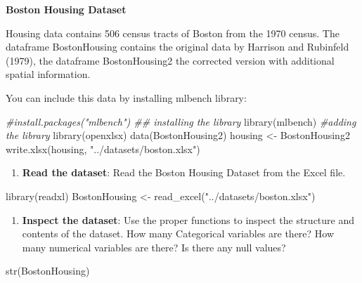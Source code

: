 \documentclass[
]{book}
\newenvironment{Shaded}{\begin{snugshade}}{\end{snugshade}}
\newcommand{\CommentTok}[1]{\textcolor[rgb]{0.56,0.35,0.01}{\textit{#1}}}
\newcommand{\FunctionTok}[1]{\textcolor[rgb]{0.00,0.00,0.00}{#1}}
\newcommand{\FunctionTok}[1]{\textcolor[rgb]{0.13,0.29,0.53}{\textbf{#1}}}
\newcommand{\NormalTok}[1]{#1}
\newcommand{\OtherTok}[1]{\textcolor[rgb]{0.56,0.35,0.01}{#1}}
\newcommand{\StringTok}[1]{\textcolor[rgb]{0.31,0.60,0.02}{#1}}
\providecommand{\tightlist}{%
  \setlength{\itemsep}{0pt}\setlength{\parskip}{0pt}}
\begin{document}
\textbf{Boston Housing Dataset}

Housing data contains 506 census tracts of Boston from the 1970 census. The dataframe BostonHousing contains the original data by Harrison and Rubinfeld (1979), the dataframe BostonHousing2 the corrected version with additional spatial information.

You can include this data by installing mlbench library:

\begin{Shaded}
\begin{Highlighting}[]
\CommentTok{\#install.packages("mlbench") \#\# installing the library}
\FunctionTok{library}\NormalTok{(mlbench) }\CommentTok{\#adding the library}
\FunctionTok{library}\NormalTok{(openxlsx)}
\FunctionTok{data}\NormalTok{(BostonHousing2)}
\NormalTok{housing }\OtherTok{\textless{}{-}}\NormalTok{ BostonHousing2}
\FunctionTok{write.xlsx}\NormalTok{(housing, }\StringTok{"../datasets/boston.xlsx"}\NormalTok{)}
\end{Highlighting}
\end{Shaded}

\begin{enumerate}
\def\labelenumi{\arabic{enumi}.}
\tightlist
\item
  \textbf{Read the dataset}: Read the Boston Housing Dataset from the Excel file.
\end{enumerate}

\begin{Shaded}
\begin{Highlighting}[]
\FunctionTok{library}\NormalTok{(readxl)}
\NormalTok{BostonHousing }\OtherTok{\textless{}{-}} \FunctionTok{read\_excel}\NormalTok{(}\StringTok{"../datasets/boston.xlsx"}\NormalTok{)}
\end{Highlighting}
\end{Shaded}

\begin{enumerate}
\def\labelenumi{\arabic{enumi}.}
\setcounter{enumi}{1}
\tightlist
\item
  \textbf{Inspect the dataset}: Use the proper functions to inspect the structure and contents of the dataset. How many Categorical variables are there? How many numerical variables are there? Is there any null values?
\end{enumerate}

\begin{Shaded}
\begin{Highlighting}[]
\FunctionTok{str}\NormalTok{(BostonHousing)}
\end{Highlighting}
\end{Shaded}
\end{document}

